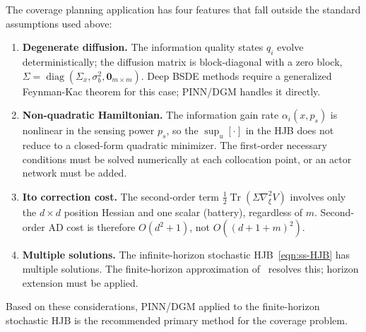 The coverage planning application has four features that fall outside the
standard assumptions used above:
\begin{enumerate}
  \item \textbf{Degenerate diffusion.}
        The information quality states $q_i$ evolve deterministically;
        the diffusion matrix is block-diagonal with a zero block,
        $\Sigma = \operatorname{diag}(\Sigma_x,\sigma_b^2,\mathbf{0}_{m\times m})$.
        Deep BSDE methods require a generalized Feynman-Kac theorem for
        this case; PINN/DGM handles it directly.
  \item \textbf{Non-quadratic Hamiltonian.}
        The information gain rate $\alpha_i(x,p_s)$ is nonlinear in
        the sensing power $p_s$, so the $\sup_u[\cdot]$ in the HJB
        does not reduce to a closed-form quadratic minimizer.
        The first-order necessary conditions must be solved numerically
        at each collocation point, or an actor network must be added.
  \item \textbf{Ito correction cost.}
        The second-order term $\frac{1}{2}\operatorname{Tr}(\Sigma\nabla_\xi^2 V)$
        involves only the $d\times d$ position Hessian and one scalar
        (battery), regardless of $m$.  Second-order AD cost is
        therefore $O(d^2+1)$, not $O((d+1+m)^2)$.
  \item \textbf{Multiple solutions.}
        The infinite-horizon stochastic HJB~\eqref{eqn:ss-HJB} has multiple
        solutions.  The finite-horizon approximation of~\cite{fotiadis2025pinn}
        resolves this; horizon extension must be applied.
\end{enumerate}
Based on these considerations, PINN/DGM applied to the finite-horizon
stochastic HJB is the recommended primary method for the coverage problem.
